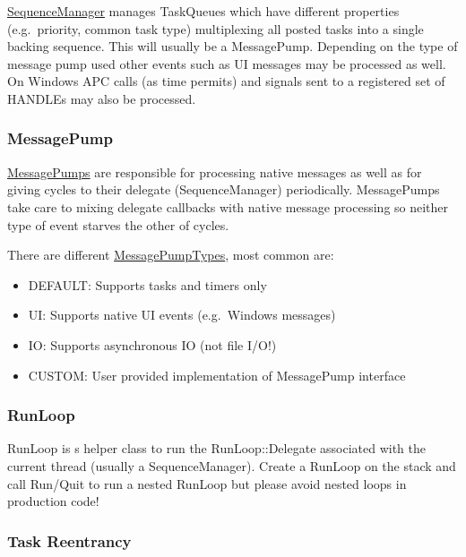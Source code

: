 \documentclass[a4paper,12pt,notitlepage,twoside,openright]{article}
\begin{document}
\href{https://cs.chromium.org/chromium/src/base/task/sequence_manager/sequence_manager.h}{SequenceManager}
manages TaskQueues which have different properties (e.g.~priority,
common task type) multiplexing all posted tasks into a single backing
sequence. This will usually be a MessagePump. Depending on the type of
message pump used other events such as UI messages may be processed as
well. On Windows APC calls (as time permits) and signals sent to a
registered set of HANDLEs may also be processed.

\subsubsection{MessagePump}

\href{https://cs.chromium.org/chromium/src/base/message_loop/message_pump.h}{MessagePumps}
are responsible for processing native messages as well as for giving
cycles to their delegate (SequenceManager) periodically. MessagePumps
take care to mixing delegate callbacks with native message processing so
neither type of event starves the other of cycles.

There are different
\href{https://cs.chromium.org/chromium/src/base/message_loop/message_pump_type.h}{MessagePumpTypes},
most common are:

\begin{itemize}
\item
  DEFAULT: Supports tasks and timers only
\item
  UI: Supports native UI events (e.g.~Windows messages)
\item
  IO: Supports asynchronous IO (not file I/O!)
\item
  CUSTOM: User provided implementation of MessagePump interface
\end{itemize}

\subsubsection{RunLoop}

RunLoop is s helper class to run the RunLoop::Delegate associated with
the current thread (usually a SequenceManager). Create a RunLoop on the
stack and call Run/Quit to run a nested RunLoop but please avoid nested
loops in production code!

\subsubsection{Task Reentrancy}
\end{document}
